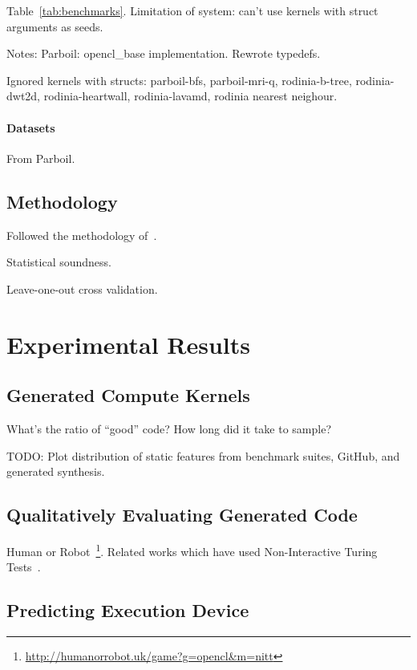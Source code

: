 \documentclass[preprint,nonatbib,10pt,nocopyrightspace]{sigplanconf}
\begin{document}
Table~\ref{tab:benchmarks}. Limitation of system: can't use kernels
with struct arguments as seeds.

Notes: Parboil: opencl\_base implementation. Rewrote typedefs.

Ignored kernels with structs: %
parboil-bfs, %
parboil-mri-q, %
rodinia-b-tree, %
rodinia-dwt2d, %
rodinia-heartwall, %
rodinia-lavamd, %
rodinia nearest neighour.


\paragraph{Datasets}

From Parboil.


\subsection{Methodology}

Followed the methodology of~\cite{Grewe2013}.

Statistical soundness.

Leave-one-out cross validation.


\section{Experimental Results}\label{sec:evaluation}


\subsection{Generated Compute Kernels}\label{subsec:}

What's the ratio of ``good'' code? How long did it take to sample?

TODO: Plot distribution of static features from benchmark suites,
GitHub, and generated synthesis.


\subsection{Qualitatively Evaluating Generated Code}\label{subsec:}

Human or
Robot~\footnote{\url{http://humanorrobot.uk/game?g=opencl&m=nitt}}. Related
works which have used Non-Interactive Turing
Tests~\cite{Gao2015a,Zhang2016}.


\subsection{Predicting Execution Device}\label{subsec:}
\end{document}
